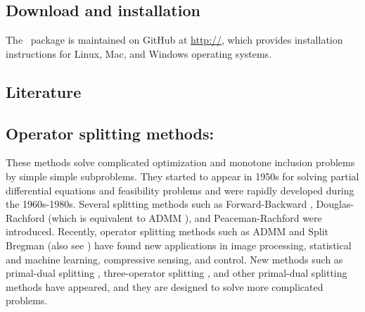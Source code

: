 
\subsection{Download and installation}
The \pkg~package is maintained on GitHub at \url{http://}, which provides installation instructions for Linux, Mac, and Windows operating systems. 
\subsection{Literature}
\subsection*{Operator splitting methods:}  These methods solve complicated optimization and monotone inclusion problems by simple simple subproblems. They started to appear in 1950s for  solving partial differential equations and feasibility problems and were rapidly developed during the 1960s-1980s. Several splitting methods such as Forward-Backward \cite{Passty1979_ergodic}, Douglas-Rachford \cite{DR56} (which is equivalent to ADMM \cite{GabayMercier1976_dual,GlowinskiMarroco1975_lapproximation}), and Peaceman-Rachford \cite{PR} were introduced. Recently,
operator splitting methods such as ADMM and Split Bregman \cite{GoldsteinOsher2009_split} (also see \cite{WangYangYinZhang2008_NewAlternating}) have found new applications in image processing,
statistical and machine learning, compressive sensing, and control. New methods such as primal-dual splitting \cite{Condat2013_primaldual,Vu2013_splitting}, three-operator splitting \cite{DavisYin2015_threeoperator}, and other primal-dual splitting methods \cite{ChenHuangZhang2016_primaldual,ChenHuangZhang2016_primalduala,LiShenXuZhang2015_multistep} have appeared, and they are designed to  solve more complicated problems.


